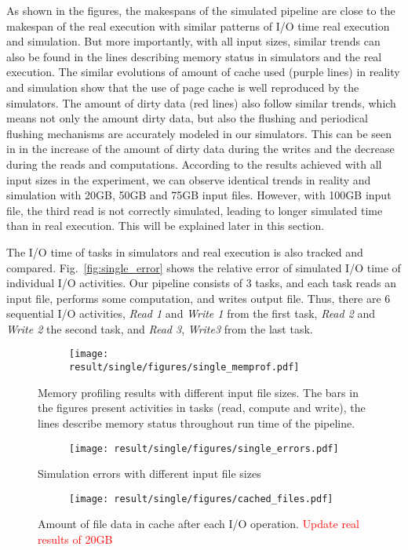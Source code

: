 \documentclass[conference]{IEEEtran}
\begin{document}
			As shown in the figures, the makespans of the simulated pipeline are
			close to the makespan of the real execution with similar patterns of I/O time
			real execution and simulation.
			But more importantly, with all input sizes, similar trends can also be found
			in the lines describing memory status in simulators and the real execution.
			The similar evolutions of amount of cache used (purple lines) in reality
			and simulation show that the use of page cache is well reproduced by the simulators.
			The amount of dirty data (red lines) also follow similar trends,
			which means not only the amount dirty data, but also the flushing and
			periodical flushing mechanisms are accurately modeled in our simulators.
			This can be seen in in the increase of the amount of dirty data during the writes
			and the decrease during the reads and computations.
			According to the results achieved with all input sizes in the experiment,
			we can observe identical trends in reality and simulation with 20GB,
			50GB and 75GB input files. However, with 100GB input file,
			the third read is not correctly simulated, leading to longer simulated time
			than in real execution. This will be explained later in this section.

			The I/O time of tasks in simulators and real execution is also tracked and compared.
			Fig.~\ref{fig:single_error} shows the relative error of simulated I/O time
			of individual I/O activities.
			Our pipeline consists of 3 tasks, and each task reads an input file,
			performs some computation, and writes output file.
			Thus, there are 6 sequential I/O activities, \textit{Read 1} and \textit{Write 1}
			from the first task, \textit{Read 2} and \textit{Write 2} the second task,
			and \textit{Read 3}, \textit{Write3} from the last task.

			\begin{figure*}
			\centering
			\begin{subfigure}{\linewidth}
				\centering
   				\texttt{[image: result/single/figures/single\_memprof.pdf]}
			\end{subfigure}
			\caption{Memory profiling results with different input file sizes.
			The bars in the figures present activities in tasks (read, compute and write),
			the lines describe memory status throughout run time of the pipeline.}
			\label{fig:single_memprof}
			\begin{subfigure}{\linewidth}
				\centering
   				\texttt{[image: result/single/figures/single\_errors.pdf]}
			\end{subfigure}
			\caption{Simulation errors with different input file sizes}
			\label{fig:single_error}
			\begin{subfigure}{\linewidth}
				\centering
   				\texttt{[image: result/single/figures/cached\_files.pdf]}
			\end{subfigure}
			\label{fig:single_cache}
   			\caption{Amount of file data in cache after each I/O operation. 
   			\textcolor{red}{Update real results of 20GB}}
			\end{figure*}
\end{document}

